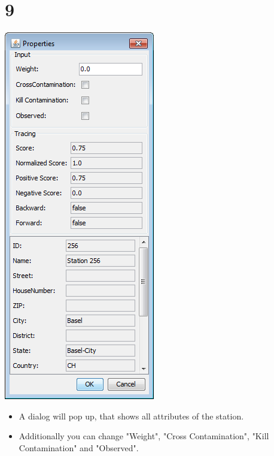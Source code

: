 \documentclass{beamer}
\begin{document}
\section{9}
\begin{frame}
	\begin{center}
  		\includegraphics[height=0.6\textheight]{9.png}
	\end{center}
	\begin{itemize}
		\item A dialog will pop up, that shows all attributes of the station.
		\item Additionally you can change "Weight", "Cross Contamination", "Kill Contamination" and "Observed".		
	\end{itemize}
\end{frame}
\end{document}
